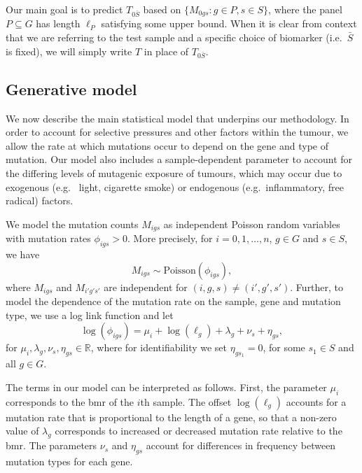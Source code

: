 \documentclass[../thesis.tex]{subfiles}
\begin{document}
Our main goal is to predict $T_{0\bar{S}}$ based on $\{M_{0gs}: g \in P, s \in S\}$, where the panel $P \subseteq G$ has length $\ell_P$ satisfying some upper bound. When it is clear from context that we are referring to the test sample and a specific choice of biomarker (i.e.~$\bar{S}$ is fixed), we will simply write $T$ in place of $T_{0\bar{S}}$. 

\subsection{Generative model \label{sec:genmodel}}
We now describe the main statistical model that underpins our methodology. In order to account for selective pressures and other factors within the tumour, we allow the rate at which mutations occur to depend on the gene and type of mutation. Our model also includes a sample-dependent parameter to account for the differing levels of mutagenic exposure of tumours, which may occur due to exogenous (e.g.~ light, cigarette smoke) or endogenous (e.g.~inflammatory, free radical) factors.  

We model the mutation counts $M_{igs}$ as independent Poisson random variables with mutation rates $\phi_{igs} > 0$. More precisely, for $i = 0, 1, \ldots, n$, $g \in G$ and $s \in S$, we have
\begin{equation}
    \label{eq:Poisson}
M_{igs} \sim \mathrm{Poisson}(\phi_{igs}),
\end{equation}
where $M_{igs}$ and $M_{i'g's'}$ are independent for $(i,g,s) \neq (i',g',s')$.  Further, to model the dependence of the mutation rate on the sample, gene and mutation type, we use a log link function and let 
\begin{equation}
    \label{eq:loglink}
\log(\phi_{igs}) =  \mu_i + \log(\ell_g) + \lambda_g + \nu_s + \eta_{gs},
\end{equation} 
for $\mu_i, \lambda_{g},\nu_{s},\eta_{gs} \in \mathbb{R}$, where for identifiability we set $\eta_{gs_1} = 0$, for  some $s_1 \in S$ and all $g \in G$. 

The terms in our model can be interpreted as follows. First, the parameter $\mu_i$ corresponds to the \gls{bmr} of the $i$th sample. The offset $\log(\ell_g)$ accounts for a mutation rate that is proportional to the length of a gene, so that a non-zero value of $\lambda_g$ corresponds to increased or decreased mutation rate relative to the \gls{bmr}.  The parameters $\nu_s$ and $\eta_{gs}$ account for differences in frequency between mutation types for each gene. 
\end{document}
